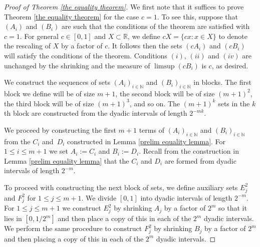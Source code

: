 \documentclass[12pt]{article}
\begin{document}
\begin{proof}[Proof of Theorem \ref{the equality theorem}]
We first note that it suffices to prove Theorem \ref{the equality theorem} for the case $c=1$. To see this, suppose that $(A_i)$ and $(B_i)$ are such that the conditions of the theorem are satisfied with $c=1$. For general $c \in [0,1]$ and $X \subset \mathbb{R}$, we define $cX= \{cx: x \in X\}$ to denote the rescaling of $X$ by a factor of $c$. It follows then the sets $(cA_i)$ and $(cB_i)$ will satisfy the conditions of the theorem. Conditions $(i)$, $(ii)$ and $(iv)$ are unchanged by the shrinking and the measure of $\limsup(cB_i)$ is $c$, as desired. \label{c argument}


    We construct the sequences of sets $(A_i)_{i \in \mathbb{N}}$ and $(B_i)_{i \in \mathbb{N}}$ in blocks. The first block we define will be of size $m+1$, the second block will be of size $(m+1)^2$, the third block will be of size $(m+1)^3$, and so on. The $(m+1)^k$ sets in the $k$th block are constructed from the dyadic intervals of length $2^{-mk}$.

    We proceed by constructing the first $m+1$ terms of $(A_i)_{i \in \mathbb{N}}$ and $(B_i)_{i \in \mathbb{N}}$ from the $C_i$ and~$D_i$ constructed in Lemma \ref{prelim equality lemma}. For $1\leq i \leq m+1$ we set $A_i:=C_i$ and $B_i:=D_i$. Recall from the construction in Lemma \ref{prelim equality lemma} that the $C_i$ and $D_i$ are formed from dyadic intervals of length $2^{-m}$.
    
    To proceed with constructing the next block of sets, we define auxiliary sets $E^2_j$ and $F^2_j$ for $1 \leq j \leq m+1$. We divide $[0,1]$ into dyadic intervals of length $2^{-m}$. For $1 \leq j \leq m+1$ we construct $E^2_{j}$  by shrinking $A_j$ by a factor of $2^{m}$ so that it lies in $[0,1/2^{m}]$ and then place a copy of this in each of the $2^{m}$ dyadic intervals.
    We perform the same procedure to construct $F^2_j$ by shrinking $B_j$ by a factor of $2^{m}$ and then placing a copy of this in each of the $2^{m}$ dyadic intervals. 


\end{proof}
\end{document}
